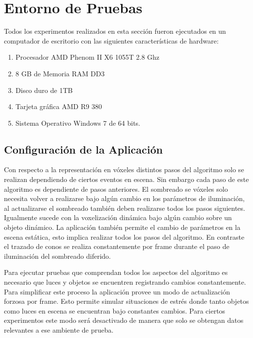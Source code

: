 \section{Entorno de Pruebas}
Todos los experimentos realizados en esta sección fueron ejecutados en un computador de escritorio con las siguientes características de hardware:

\begin{enumerate}
    \item Procesador AMD Phenom II X6 1055T 2.8 Ghz
    \item 8 GB de Memoria RAM DD3
    \item Disco duro de 1TB 
    \item Tarjeta gráfica AMD R9 380
    \item Sistema Operativo Windows 7 de 64 bits.
\end{enumerate}

\subsection{Configuración de la Aplicación}

Con respecto a la representación en vóxeles distintos pasos del algoritmo solo se realizan dependiendo de ciertos eventos en escena. Sin embargo cada paso de este algoritmo es dependiente de pasos anteriores. El sombreado se vóxeles solo necesita volver a realizarse bajo algún cambio en los parámetros de iluminación, al actualizarse el sombreado también deben realizarse todos los pasos siguientes. Igualmente sucede con la voxelización dinámica bajo algún cambio sobre un objeto dinámico. La aplicación también permite el cambio de parámetros en la escena estática, esto implica realizar todos los pasos del algoritmo. En contraste el trazado de conos se realiza constantemente por frame durante el paso de iluminación del sombreado diferido.

Para ejecutar pruebas que comprendan todos los aspectos del algoritmo es necesario que luces y objetos se encuentren registrando cambios constantemente. Para simplificar este proceso la aplicación provee un modo de actualización forzosa por frame. Esto permite simular situaciones de estrés donde tanto objetos como luces en escena se encuentran bajo constantes cambios. Para ciertos experimentos este modo será desactivado de manera que solo se obtengan datos relevantes a ese ambiente de prueba.
